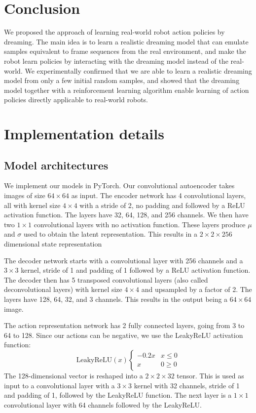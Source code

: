 \documentclass[letterpaper, 10 pt, conference]{ieeeconf}
\begin{document}
\section{Conclusion}

We proposed the approach of learning real-world robot action policies by dreaming. The main idea is to learn a realistic dreaming model that can emulate samples equivalent to frame sequences from the real environment, and make the robot learn policies by interacting with the dreaming model instead of the real-world. We experimentally confirmed that we are able to learn a realistic dreaming model from only a few initial random samples, and showed that the dreaming model together with a reinforcement learning algorithm enable learning of action policies directly applicable to real-world robots.





{\small


}

\newpage
\appendix\section{Implementation details}\subsection{Model architectures}
We implement our models in PyTorch. Our convolutional autoencoder takes images of size $64\times 64$ as input. The encoder network has 4 convolutional layers, all with kernel size $4\times 4$ with a stride of 2, no padding and followed by a ReLU activation function. The layers have 32, 64, 128, and 256 channels. We then have two $1\times 1$ convolutional layers with no activation function. These layers produce $\mu$ and $\sigma$ used to obtain the latent representation.  This results in a $2\times 2\times 256$ dimensional state representation

The decoder network starts with a convolutional layer with 256 channels and a $3\times 3$ kernel, stride of 1 and padding of 1 followed by a ReLU activation function. The decoder then has 5 transposed convolutional layers (also called deconvolutional layers) with kernel size $4 \times 4$ and upsampled by a factor of 2. The layers have 128, 64, 32, and 3 channels. This results in the output being a $64\times 64$ image.

The action representation network has 2 fully connected layers, going from 3 to 64 to 128. Since our actions can be negative, we use the LeakyReLU activation function:
\begin{equation}
    \text{LeakyReLU}(x)\begin{cases} 
      -0.2x & x\le 0 \\
      x & 0\geq 0
   \end{cases}
\end{equation}
The 128-dimensional vector is reshaped into a $2\times 2\times 32$ tensor. This is used as input to a convolutional layer with a $3\times 3$ kernel with 32 channels, stride of 1 and padding of 1, followed by the LeakyReLU function. The next layer is a $1\times 1$ convolutional layer with 64 channels followed by the LeakyReLU.
\end{document}
